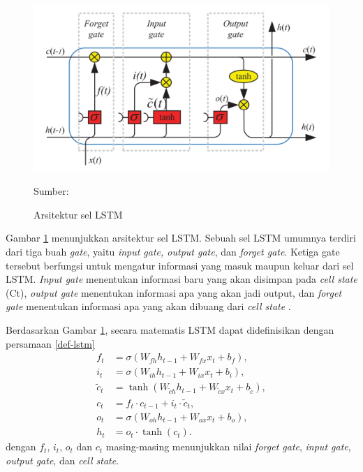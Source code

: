 \begin{figure}[H]
  \centering
  \includegraphics[width=.8\linewidth]{img/ecg-arch.png}
  \caption{Arsitektur sel LSTM}
  Sumber: \textcite{yuReviewRecurrentNeural2019}
  \label{fig:arsitektur-lstm}
\end{figure}

Gambar \ref{fig:arsitektur-lstm} menunjukkan arsitektur sel LSTM. Sebuah sel LSTM umumnya terdiri dari tiga buah \textit{gate}, yaitu \textit{input gate, output gate}, dan \textit{forget gate}. Ketiga gate tersebut berfungsi untuk mengatur informasi yang masuk maupun keluar dari sel LSTM.
\textit{Input gate} menentukan informasi baru yang akan disimpan pada \textit{cell state} (Ct), \textit{output gate} menentukan informasi apa yang akan jadi output, dan \textit{forget gate} menentukan informasi apa yang akan dibuang dari \textit{cell state} \parencite{yuReviewRecurrentNeural2019}.

Berdasarkan Gambar \ref{fig:arsitektur-lstm}, secara matematis LSTM dapat didefinisikan dengan persamaan \ref{def-lstm}
\begin{equation}
\begin{split}
    f_t &= \sigma (W_{fh}h_{t-1} + W_{fx}x_t + b_f), \\
    i_t &= \sigma (W_{ih}h_{t-1} + W_{ix}x_t + b_i),\\
    \tilde{c}_t &= \tanh (W_{\tilde{c}h}h_{t-1} + W_{\tilde{c}x}x_t + b_{\tilde{c}}), \\
    c_t &= f_t \cdot c_{t-1}+ i_t \cdot \tilde{c}_t,\\
    o_t &= \sigma (W_{oh}h_{t-1} + W_{ox}x_t + b_o), \\
    h_t &= o_t \cdot \tanh(c_t).
\end{split}
    \label{def-lstm}
\end{equation}
\noindent
dengan \(f_t\), \(i_t\), \(o_t\) dan \(c_t\) masing-masing menunjukkan nilai \emph{forget gate}, \emph{input gate}, \emph{output gate}, dan \emph{cell state}.

